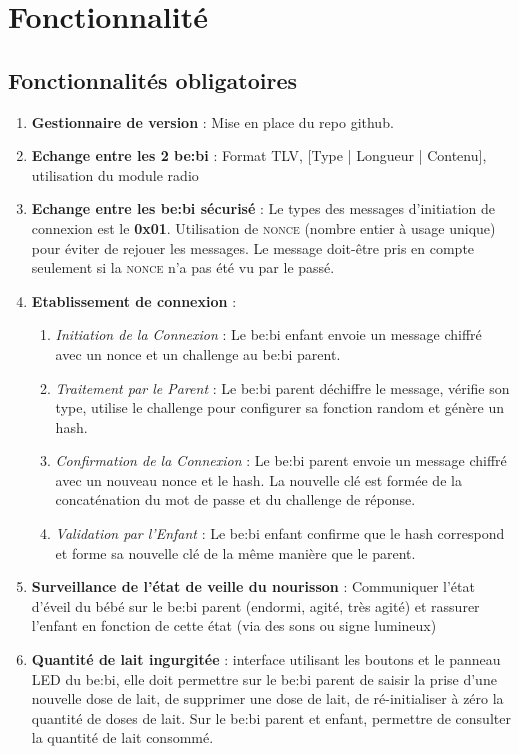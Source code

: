 \documentclass[12pt, letterpaper]{article}
\begin{document}
\section*{Fonctionnalité}
\subsection{Fonctionnalités obligatoires}
\begin{enumerate}
    \item \textbf{Gestionnaire de version} : Mise en place du repo github.
    \item \textbf{Echange entre les 2 be:bi} : Format TLV, [Type | Longueur | Contenu], utilisation du module radio
    \item \textbf{Echange entre les be:bi sécurisé} : Le types des messages d'initiation de connexion est le \textbf{0x01}. Utilisation de \textsc{nonce} (nombre entier à usage unique) pour éviter de rejouer les messages. Le message doit-être pris en compte seulement
    si la \textsc{nonce} n'a pas été vu par le passé.
    \item \textbf{Etablissement de connexion} :
    \begin{enumerate}
        \item \textit{Initiation de la Connexion} : Le be:bi enfant envoie un message chiffré avec un nonce et un challenge au be:bi parent.
        \item \textit{Traitement par le Parent} : Le be:bi parent déchiffre le message, vérifie son type, utilise le challenge pour configurer sa fonction random et génère un hash.
        \item \textit{Confirmation de la Connexion} : Le be:bi parent envoie un message chiffré avec un nouveau nonce et le hash. La nouvelle clé est formée de la concaténation du mot de passe et du challenge de réponse.
        \item \textit{Validation par l'Enfant} : Le be:bi enfant confirme que le hash correspond et forme sa nouvelle clé de la même manière que le parent.
    \end{enumerate}
    \item \textbf{Surveillance de l'état de veille du nourisson} : Communiquer l'état d'éveil du bébé sur le be:bi parent (endormi, agité, très agité) et rassurer l'enfant en fonction de cette état (via des sons ou signe lumineux)
    \item \textbf{Quantité de lait ingurgitée} : interface utilisant les boutons et le panneau LED du be:bi, elle doit permettre sur le be:bi parent de saisir la prise d'une nouvelle dose de lait, de supprimer une dose de lait, de ré-initialiser à zéro la quantité de doses de lait. Sur le be:bi parent et enfant, permettre de consulter la quantité de lait consommé.
\end{enumerate}
\end{document}
